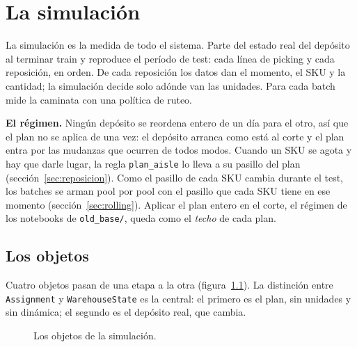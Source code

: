\documentclass[11pt,a4paper,oneside]{report}
\newcommand{\code}[1]{\texttt{\small #1}}
\begin{document}
\chapter{La simulación}
\label{cap:simulacion}

La simulación es la medida de todo el sistema. Parte del estado real del depósito al
terminar train y reproduce el período de test: cada línea de picking y cada reposición, en
orden. De cada reposición los datos dan el momento, el SKU y la cantidad; la simulación decide
solo adónde van las unidades. Para cada batch mide la caminata con una política de ruteo.

\textbf{El régimen.} Ningún depósito se reordena entero de un día para el otro, así que el plan
no se aplica de una vez: el depósito arranca como está al corte y el plan entra por las
mudanzas que ocurren de todos modos. Cuando un SKU se agota y hay que darle lugar, la regla
\code{plan\_aisle} lo lleva a su pasillo del plan (sección~\ref{sec:reposicion}). Como el pasillo de cada SKU cambia durante
el test, los batches se arman pool por pool con el pasillo que cada SKU tiene en ese momento
(sección~\ref{sec:rolling}). Aplicar el plan entero en el corte, el régimen de los notebooks de
\code{old\_base/}, queda como el \emph{techo} de cada plan.

\section{Los objetos}

Cuatro objetos pasan de una etapa a la otra (figura~\ref{fig:objetos}). La distinción entre
\code{Assignment} y \code{WarehouseState} es la central: el primero es el plan, sin unidades y
sin dinámica; el segundo es el depósito real, que cambia.

\begin{figure}[ht]
\centering
{}
\caption{Los objetos de la simulación.}
\label{fig:objetos}
\end{figure}
\end{document}
